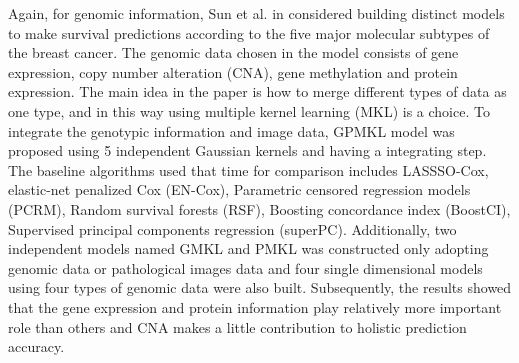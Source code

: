 \documentclass[journal,twoside,web]{ieeecolor}
\begin{document}
Again, for genomic information, Sun et al. in \cite{sun2018integrating} considered building distinct models to make survival predictions according to the five major molecular subtypes of the breast cancer.
The genomic data chosen in the model consists of gene expression, copy number alteration (CNA), gene methylation and protein expression.
The main idea in the paper is how to merge different types of data as one type, and in this way using multiple kernel learning (MKL) is a choice.
To integrate the genotypic information and image data, GPMKL model was proposed using 5 independent Gaussian kernels and having a integrating step.
The baseline algorithms used that time for comparison includes LASSSO-Cox\cite{tibshirani1997lasso}, elastic-net penalized Cox (EN-Cox)\cite{yang2013cocktail}, Parametric censored regression models (PCRM)\cite{kalbfleisch2011statistical}, Random survival forests (RSF)\cite{ishwaran2008random}, Boosting concordance index (BoostCI)\cite{mayr2014boosting}, Supervised principal components regression (superPC)\cite{bair2006prediction}.
Additionally, two independent models named GMKL and PMKL was constructed only adopting genomic data or pathological images data and four single dimensional models using four types of genomic data were also built. 
Subsequently, the results showed that the gene expression and protein information play relatively more important role than others and CNA makes a little contribution to holistic prediction accuracy.
\end{document}
